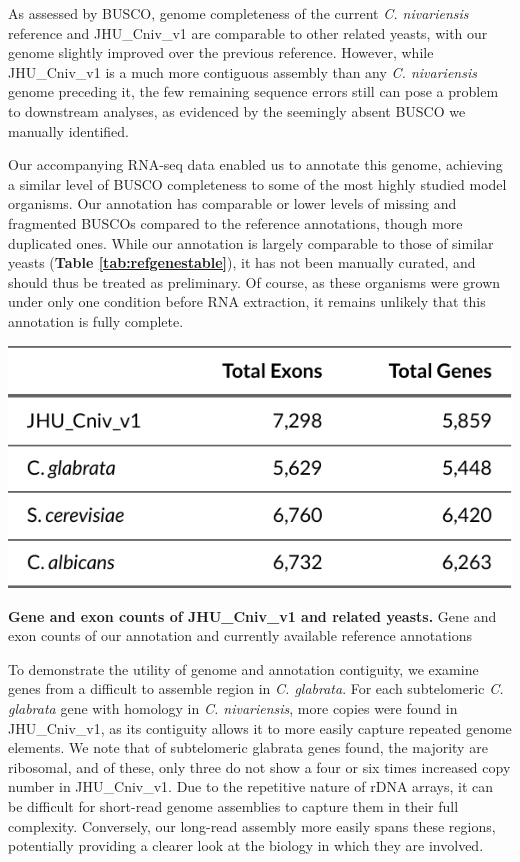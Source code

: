 As assessed by BUSCO, genome completeness of the current \textit{C. nivariensis} reference and JHU\_Cniv\_v1 are comparable to other related yeasts, with our genome slightly improved over the previous reference. However, while JHU\_Cniv\_v1 is a much more contiguous assembly than any \textit{C. nivariensis} genome preceding it, the few remaining sequence errors still can pose a problem to downstream analyses, as evidenced by the seemingly absent BUSCO we manually identified.

Our accompanying RNA-seq data enabled us to annotate this genome, achieving a similar level of BUSCO completeness to some of the most highly studied model organisms. Our annotation has comparable or lower levels of missing and fragmented BUSCOs compared to the reference annotations, though more duplicated ones. While our annotation is largely comparable to those of similar yeasts ({\bf Table \ref{tab:refgenestable}}), it has not been manually curated, and should thus be treated as preliminary. Of course, as these organisms were grown under only one condition before RNA extraction, it remains unlikely that this annotation is fully complete.

\begin{table}[!ht]
\centering
\includegraphics[width = .75\linewidth,keepaspectratio]{figure/refgenestable.pdf}
\caption[Gene and exon counts of JHU\_Cniv\_v1 and related yeasts]{{\bf Gene and exon counts of JHU\_Cniv\_v1 and related yeasts.} Gene and exon counts of our annotation and currently available reference annotations }
\label{tab:refgenestable}
\end{table}


To demonstrate the utility of genome and annotation contiguity, we examine genes from a difficult to assemble region in \textit{C. glabrata}. For each subtelomeric \textit{C. glabrata} gene with homology in \textit{C. nivariensis}, more copies were found in JHU\_Cniv\_v1, as its contiguity allows it to more easily capture repeated genome elements. We note that of subtelomeric glabrata genes found, the majority are ribosomal, and of these, only three do not show a four or six times increased copy number in JHU\_Cniv\_v1. Due to the repetitive nature of rDNA arrays, it can be difficult for short-read genome assemblies to capture them in their full complexity. Conversely, our long-read assembly more easily spans these regions, potentially providing a clearer look at the biology in which they are involved.

